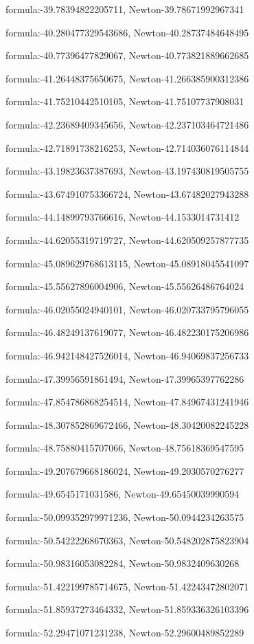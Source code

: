 \documentclass{article}
\begin{document}
formula:-39.78394822205711, Newton-39.78671992967341

formula:-40.280477329543686, Newton-40.28737484648495

formula:-40.77396477829067, Newton-40.773821889662685

formula:-41.26448375650675, Newton-41.266385900312386

formula:-41.75210442510105, Newton-41.75107737908031

formula:-42.23689409345656, Newton-42.237103464721486

formula:-42.71891738216253, Newton-42.714036076114844

formula:-43.19823637387693, Newton-43.197430819505755

formula:-43.674910753366724, Newton-43.67482027943288

formula:-44.14899793766616, Newton-44.1533014731412

formula:-44.62055319719727, Newton-44.620509257877735

formula:-45.089629768613115, Newton-45.08918045541097

formula:-45.55627896004906, Newton-45.55626486764024

formula:-46.02055024940101, Newton-46.020733795796055

formula:-46.48249137619077, Newton-46.482230175206986

formula:-46.942148427526014, Newton-46.94069837256733

formula:-47.39956591861494, Newton-47.39965397762286

formula:-47.854786868254514, Newton-47.84967431241946

formula:-48.307852869672466, Newton-48.30420082245228

formula:-48.75880415707066, Newton-48.75618369547595

formula:-49.207679668186024, Newton-49.2030570276277

formula:-49.6545171031586, Newton-49.65450039990594

formula:-50.099352979971236, Newton-50.0944234263575

formula:-50.54222268670363, Newton-50.548202875823904

formula:-50.98316053082284, Newton-50.9832409630268

formula:-51.422199785714675, Newton-51.42243472802071

formula:-51.85937273464332, Newton-51.859336326103396

formula:-52.29471071231238, Newton-52.29600489852289
\end{document}
